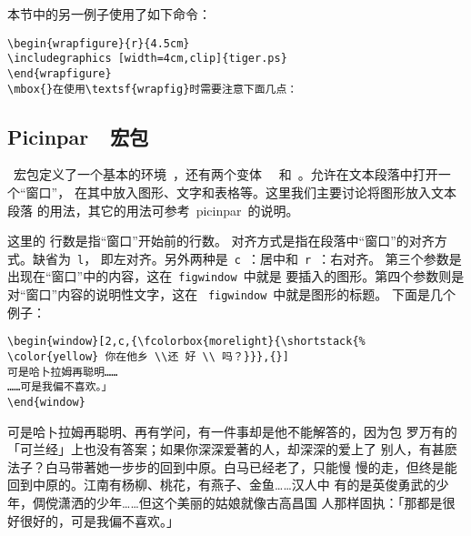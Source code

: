 本节中的另一例子使用了如下命令：
\begin{Verbatim}[xleftmargin=1cm]
\begin{wrapfigure}{r}{4.5cm}
\includegraphics [width=4cm,clip]{tiger.ps}
\end{wrapfigure}
\mbox{}在使用\textsf{wrapfig}时需要注意下面几点：
\end{Verbatim}

\subsection{Picinpar~~宏包}\label{ssec:picinpar}

~宏包定义了一个基本的环境~，还有两个变体
~~和~。允许在文本段落中打开一个``窗口''，
在其中放入图形、文字和表格等。这里我们主要讨论将图形放入文本段落
的用法，其它的用法可参考~\textsf{picinpar}~的说明。



\noindent 这里的{ 行数}是指``窗口''开始前的行数。
{ 对齐方式}是指在段落中``窗口''的对齐方式。缺省为~\texttt{l}，
即左对齐。另外两种是~\texttt{c}~：居中和~\texttt{r}~：右对齐。
第三个参数是出现在``窗口''中的内容，这在~\texttt{figwindow}~中就是
要插入的图形。第四个参数则是对``窗口''内容的说明性文字，这在
~\texttt{figwindow}~中就是图形的标题。
下面是几个例子：

\begin{Verbatim}
\begin{window}[2,c,{\fcolorbox{morelight}{\shortstack{%
\color{yellow} 你在他乡 \\还 好 \\ 吗？}}},{}]
可是哈卜拉姆再聪明……
……可是我偏不喜欢。」
\end{window}
\end{Verbatim}

\begin{window}
	可是哈卜拉姆再聪明、再有学问，有一件事却是他不能解答的，因为包
	罗万有的「可兰经」上也没有答案；如果你深深爱著的人，却深深的爱上了
	别人，有甚麽法子？白马带著她一步步的回到中原。白马已经老了，只能慢
	慢的走，但终是能回到中原的。江南有杨柳、桃花，有燕子、金鱼……汉人中
	有的是英俊勇武的少年，倜傥潇洒的少年……但这个美丽的姑娘就像古高昌国
	人那样固执：「那都是很好很好的，可是我偏不喜欢。」
\end{window}

